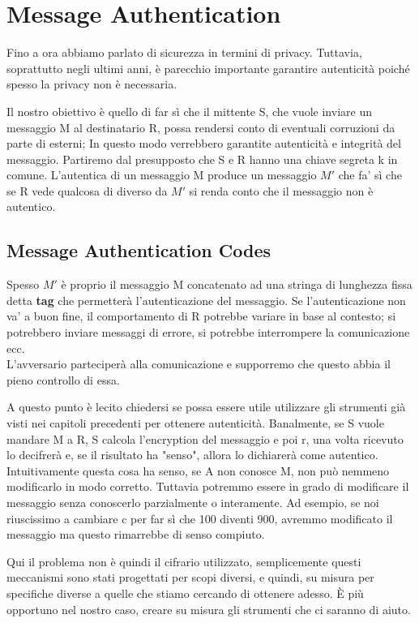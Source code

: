 \chapter{Message Authentication}
Fino a ora abbiamo parlato di sicurezza in termini di privacy. Tuttavia, soprattutto negli ultimi anni, è parecchio importante garantire autenticità poiché spesso la privacy non è necessaria. 

Il nostro obiettivo è quello di far sì che il mittente S, che vuole inviare un messaggio M al destinatario R, possa rendersi conto di eventuali corruzioni da parte di esterni; In questo modo verrebbero garantite autenticità e integrità del messaggio. 
Partiremo dal presupposto che S e R hanno una chiave segreta k in comune. L'autentica di un messaggio M produce un messaggio $M'$ che fa' sì che se R vede qualcosa di diverso da $M'$ si renda conto che il messaggio non è autentico.

\section{Message Authentication Codes}
Spesso $M'$ è proprio il messaggio M concatenato ad una stringa di lunghezza fissa detta \textbf{tag} che permetterà l'autenticazione del messaggio. Se l'autenticazione non va' a buon fine, il comportamento di R potrebbe variare in base al contesto; si potrebbero inviare messaggi di errore, si potrebbe interrompere la comunicazione ecc.\\
L'avversario parteciperà alla comunicazione e supporremo che questo abbia il pieno controllo di essa. 

A questo punto è lecito chiedersi se possa essere utile utilizzare gli strumenti già visti nei capitoli precedenti per ottenere autenticità. Banalmente, se S vuole mandare M a R, S calcola l'encryption del messaggio e poi r, una volta ricevuto lo decifrerà e, se il risultato ha "senso", allora lo dichiarerà come autentico. Intuitivamente questa cosa ha senso, se A non conosce M, non può nemmeno modificarlo in modo corretto. Tuttavia potremmo essere in grado di modificare il messaggio senza conoscerlo parzialmente o interamente. Ad esempio, se noi riuscissimo a cambiare c per far sì che 100 diventi 900, avremmo modificato il messaggio ma questo rimarrebbe di senso compiuto. 

Qui il problema non è quindi il cifrario utilizzato, semplicemente questi meccanismi sono stati progettati per scopi diversi, e quindi, su misura per specifiche diverse a quelle che stiamo cercando di ottenere adesso. È più opportuno nel nostro caso, creare su misura gli strumenti che ci saranno di aiuto. 

